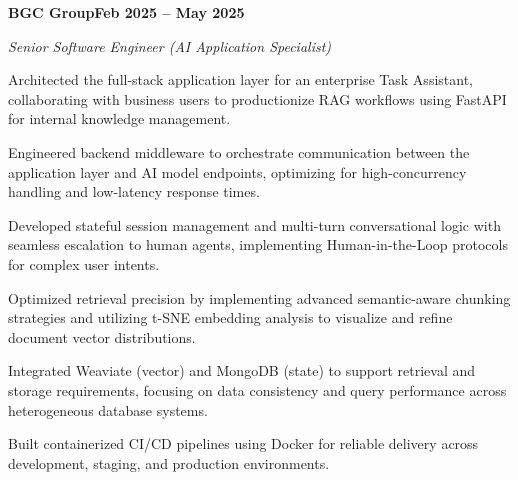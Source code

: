 \documentclass[letterpaper,10pt]{article}
\newcommand{\headingBf}[2]{\par\noindent\hspace*{10pt}\textbf{#1}\hfill\textbf{#2}}
\newcommand{\headingIt}[2]{\par\noindent\hspace*{10pt}\textit{#1}\hfill\textit{#2}}
\newenvironment{resume_list}{\vspace{-7pt}\begin{itemize}[itemsep=-2px, parsep=1pt, leftmargin=30pt]}{\end{itemize}}
\begin{document}
  \headingBf{BGC Group}{Feb 2025 -- May 2025}
  \headingIt{Senior Software Engineer (AI Application Specialist)}{}
  \begin{resume_list}
    \item Architected the full-stack application layer for an enterprise Task Assistant, collaborating with business users to productionize RAG workflows using FastAPI for internal knowledge management.
    \item Engineered backend middleware to orchestrate communication between the application layer and AI model endpoints, optimizing for high-concurrency handling and low-latency response times.
    \item Developed stateful session management and multi-turn conversational logic with seamless escalation to human agents, implementing Human-in-the-Loop protocols for complex user intents.
    \item Optimized retrieval precision by implementing advanced semantic-aware chunking strategies and utilizing t-SNE embedding analysis to visualize and refine document vector distributions.
    \item Integrated Weaviate (vector) and MongoDB (state) to support retrieval and storage requirements, focusing on data consistency and query performance across heterogeneous database systems.
    \item Built containerized CI/CD pipelines using Docker for reliable delivery across development, staging, and production environments.
  \end{resume_list}
\end{document}
